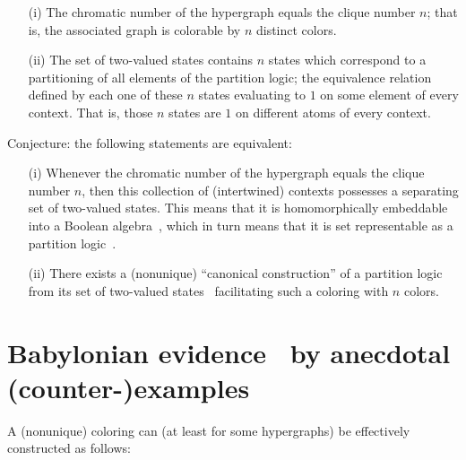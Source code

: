 \documentclass[%
  reprint,
  twocolumn,
 showpacs,
 showkeys,
 preprintnumbers,
 amsmath,amssymb,
 aps,
 pra,
  longbibliography,
 ]{revtex4-1}
\begin{document}
\begin{itemize}
\item[(i)]
The chromatic number of the hypergraph equals the clique number $n$; that is, the associated graph is colorable by $n$ distinct colors.
\item[(ii)]
The set of two-valued states contains $n$ states which correspond
to a partitioning of all elements of the partition logic;
the equivalence relation defined by each one of these $n$ states evaluating to $1$ on some element of every context.
That is, those $n$ states are $1$ on different atoms of every context.
\end{itemize}

Conjecture: the following statements are equivalent:

\begin{itemize}
\item[(i)]
Whenever the chromatic number of the hypergraph equals the clique number $n$,
then this  collection of (intertwined) contexts possesses a separating set of two-valued states.
This means that it is homomorphically embeddable into a Boolean algebra~\cite[Theorem~0]{kochen1},
which in turn means that it is set representable as a partition logic~\cite{schaller-92}.
\item[(ii)]
There exists a (nonunique) ``canonical construction'' of a partition logic
from its set of two-valued states~\cite{svozil-2001-eua} facilitating such a coloring with $n$ colors.
\end{itemize}




\section{Babylonian evidence~\cite{neugeb} by anecdotal (counter-)examples}

A (nonunique) coloring can (at least for some hypergraphs) be effectively constructed as follows:
\end{document}
